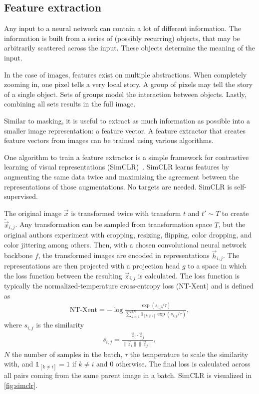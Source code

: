 \subsection{Feature extraction}

Any input to a neural network can contain a lot of different information.
The information is built from a series of (possibly recurring) objects, that may be arbitrarily scattered across the input.
These objects determine the meaning of the input.

In the case of images, features exist on multiple abstractions.
When completely zooming in, one pixel tells a very local story.
A group of pixels may tell the story of a single object.
Sets of groups model the interaction between objects.
Lastly, combining all sets results in the full image.

Similar to masking, it is useful to extract as much information as possible into a smaller image representation: a feature vector.
A feature extractor that creates feature vectors from images can be trained using various algorithms.

One algorithm to train a feature extractor is a simple framework for contrastive learning of visual representations (SimCLR)~.
SimCLR learns features by augmenting the same data twice and maximizing the agreement between the representations of those augmentations.
No targets are needed.
SimCLR is self-supervised.

The original image $\vec{x}$ is transformed twice with transform $t$ and $t' \sim T$ to create $\tilde{\vec{x}}_{i,j}$.
Any transformation can be sampled from transformation space $T$, but the original authors experiment with cropping, resizing, flipping, color dropping, and color jittering among others.
Then, with a chosen convolutional neural network backbone $f$, the transformed images are encoded in representations $\vec{h}_{i,j}$.
The representations are then projected with a projection head $g$ to a space in which the loss function between the resulting $\vec{z}_{i,j}$ is calculated.
The loss function is typically the normalized-temperature cross-entropy loss (NT-Xent) and is defined as
\begin{align}
    \text{NT-Xent} = - \log \frac{\exp(s_{i,j} / \tau)}{\sum_{k=1}^{2N}\mathbb{1}_{[k\neq i]}\exp(s_{i,j} / \tau)},
\end{align}
where $s_{i,j}$ is the similarity
\begin{align}
    s_{i,j} = \frac{\vec{z}_i \cdot \vec{z}_j }{\|\vec{z}_i\|\|\vec{z}_j\|},
\end{align}
$N$ the number of samples in the batch, $\tau$ the temperature to scale the similarity with, and $\mathbb{1}_{[k\neq i]}=1$ if $k \neq i$ and 0 otherwise.
The final loss is calculated across all pairs coming from the same parent image in a batch.
SimCLR is visualized in \cref{fig:simclr}.


